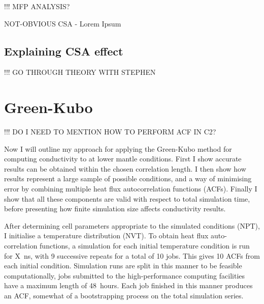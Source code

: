 !!! MFP ANALYSIS?

NOT-OBVIOUS CSA - Lorem Ipsum
















\subsection{\label{sec:3.DM.theory}Explaining CSA effect}

!!! GO THROUGH THEORY WITH STEPHEN


 










\section{\label{sec:3.GK}Green-Kubo}

!!! DO I NEED TO MENTION HOW TO PERFORM ACF IN C2?

Now I will outline my approach for applying the Green-Kubo method for computing conductivity to \bdgs at lower mantle conditions. First I show accurate results can be obtained within the chosen correlation length. I then show how results represent a large sample of possible conditions, and a way of minimising error by combining multiple heat flux autocorrelation functions (ACFs). Finally I show that all these components are valid with respect to total simulation time, before presenting how finite simulation size affects conductivity results.

After determining cell parameters appropriate to the simulated conditions (NPT), I initialise a temperature distribution (NVT). To obtain heat flux auto-correlation functions, a simulation for each initial temperature condition is run for X~ns, with 9 successive repeats for a total of 10 jobs. This gives 10 ACFs from each initial condition. Simulation runs are split in this manner to be feasible computationally, jobs submitted to the high-performance computing facilities have a maximum length of 48~hours. Each job finished in this manner produces an ACF, somewhat of a bootstrapping process on the total simulation series.

